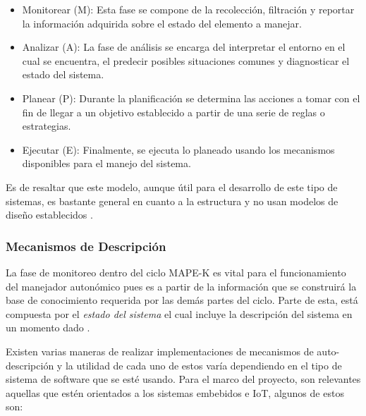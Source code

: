 \begin{itemize}
    \item Monitorear (M): Esta fase se compone de la recolección, filtración y reportar la información adquirida sobre el estado del elemento a manejar.
    \item Analizar (A): La fase de análisis se encarga del interpretar el entorno en el cual se encuentra, el predecir posibles situaciones comunes y diagnosticar el estado del sistema.
    \item Planear (P): Durante la planificación se determina las acciones a tomar con el fin de llegar a un objetivo establecido a partir de una serie de reglas o estrategias.
    \item Ejecutar (E): Finalmente, se ejecuta lo planeado usando los mecanismos disponibles para el manejo del sistema. 
\end{itemize}

Es de resaltar que este modelo, aunque útil para el desarrollo de este tipo de sistemas, es bastante general en cuanto a la estructura y no usan modelos de diseño establecidos \cite{Ouareth_2018}. 

\subsubsection{Mecanismos de Descripción}


La fase de monitoreo dentro del ciclo MAPE-K es vital para el funcionamiento del manejador autonómico pues es a partir de la información que se construirá la base de conocimiento requerida por las demás partes del ciclo. Parte de esta, está compuesta por el \textit{estado del sistema} el cual incluye la descripción del sistema en un momento dado \cite{Weiss_2011}.

Existen varias maneras de realizar implementaciones de mecanismos de auto-descripción y la utilidad de cada uno de estos varía dependiendo en el tipo de sistema de software que se esté usando. Para el marco del proyecto, son relevantes aquellas que estén orientados a los sistemas embebidos e  IoT, algunos de estos son:

